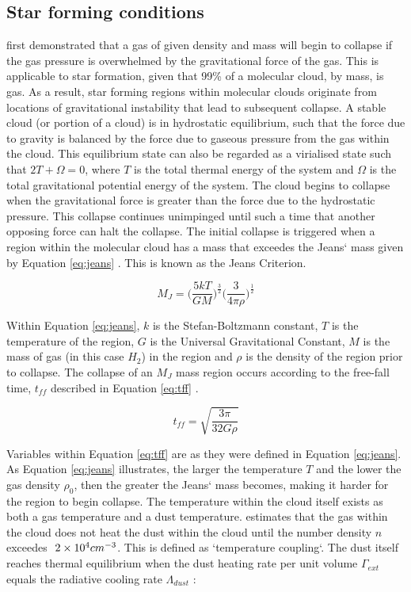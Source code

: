 \documentclass{report}
\begin{document}
\subsection{Star forming conditions} \label{sec:conditions}
\textcite{jeans} first demonstrated that a gas of given density and mass will begin to collapse if the gas pressure is overwhelmed by the gravitational force of the gas. This is applicable to star formation, given that 99\% of a molecular cloud, by mass, is gas. As a result, star forming regions within molecular clouds originate from locations of gravitational instability that lead to subsequent collapse. A stable cloud (or portion of a cloud) is in hydrostatic equilibrium, such that the force due to gravity is balanced by the force due to gaseous pressure from the gas within the cloud. This equilibrium state can also be regarded as a virialised state such that $2T+\Omega=0$, where $T$ is the total thermal energy of the system and $\Omega$ is the total gravitational potential energy of the system. The cloud begins to collapse when the gravitational force is greater than the force due to the hydrostatic pressure. This collapse continues unimpinged until such a time that another opposing force can halt the collapse. The initial collapse is triggered when a region within the molecular cloud has a mass that exceedes the Jeans` mass given by Equation \ref{eq:jeans} \parencite{lecture}. This is known as the Jeans Criterion.

\begin{equation}
  M_{J} = \Bigg( \frac{5kT}{GM} \Bigg )^\frac{3}{2} \Bigg( \frac{3}{4\pi\rho} \Bigg )^\frac{1}{2}
  \label{eq:jeans}
\end{equation}

Within Equation \ref{eq:jeans}, $k$ is the Stefan-Boltzmann constant, $T$ is the temperature of the region, $G$ is the Universal Gravitational Constant, $M$ is the mass of gas (in this case $H_{2}$) in the region and $\rho$ is the density of the region prior to collapse. The collapse of an $M_{J}$ mass region occurs according to the free-fall time, $t_{ff}$ described in Equation \ref{eq:tff} \parencite{jeans}.

\begin{equation}
  t_{ff} = \sqrt{\frac{3\pi}{32G\rho}}
  \label{eq:tff}
\end{equation}

Variables within Equation \ref{eq:tff} are as they were defined in Equation \ref{eq:jeans}. As Equation \ref{eq:jeans} illustrates, the larger the temperature $T$ and the lower the gas density $\rho_{0}$, then the greater the Jeans` mass becomes, making it harder for the region to begin collapse. The temperature within the cloud itself exists as both a gas temperature and a dust temperature. \textcite{decouple} estimates that the gas within the cloud does not heat the dust within the cloud until the number density $n$ exceedes $~2\times10^{4}\/cm^{-3}$. This is defined as `temperature coupling`. The dust itself reaches thermal equilibrium when the dust heating rate per unit volume $\Gamma_{ext}$ equals the radiative cooling rate $\Lambda_{dust}$ \parencite{treecol}:
\end{document}
